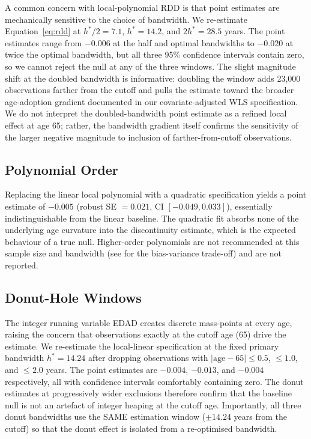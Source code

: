 \documentclass[12pt]{article}
\begin{document}
A common concern with local-polynomial RDD is that point estimates are mechanically sensitive to the choice of bandwidth. We re-estimate Equation~\ref{eq:rdd} at $h^*/2 = 7.1$, $h^* = 14.2$, and $2 h^* = 28.5$ years. The point estimates range from $-0.006$ at the half and optimal bandwidths to $-0.020$ at twice the optimal bandwidth, but all three 95\% confidence intervals contain zero, so we cannot reject the null at any of the three windows. The slight magnitude shift at the doubled bandwidth is informative: doubling the window adds 23,000 observations farther from the cutoff and pulls the estimate toward the broader age-adoption gradient documented in our covariate-adjusted WLS specification. We do not interpret the doubled-bandwidth point estimate as a refined local effect at age 65; rather, the bandwidth gradient itself confirms the sensitivity of the larger negative magnitude to inclusion of farther-from-cutoff observations.

\subsection{Polynomial Order}

Replacing the linear local polynomial with a quadratic specification yields a point estimate of $-0.005$ (robust SE $=0.021$, CI $[-0.049, 0.033]$), essentially indistinguishable from the linear baseline. The quadratic fit absorbs none of the underlying age curvature into the discontinuity estimate, which is the expected behaviour of a true null. Higher-order polynomials are not recommended at this sample size and bandwidth (see \citealp{calonico2014} for the bias-variance trade-off) and are not reported.

\subsection{Donut-Hole Windows}

The integer running variable EDAD creates discrete mass-points at every age, raising the concern that observations exactly at the cutoff age (65) drive the estimate. We re-estimate the local-linear specification at the fixed primary bandwidth $h^* = 14.24$ after dropping observations with $|\text{age} - 65| \le 0.5$, $\le 1.0$, and $\le 2.0$ years. The point estimates are $-0.004$, $-0.013$, and $-0.004$ respectively, all with confidence intervals comfortably containing zero. The donut estimates at progressively wider exclusions therefore confirm that the baseline null is not an artefact of integer heaping at the cutoff age. Importantly, all three donut bandwidths use the SAME estimation window ($\pm 14.24$ years from the cutoff) so that the donut effect is isolated from a re-optimised bandwidth.
\end{document}
